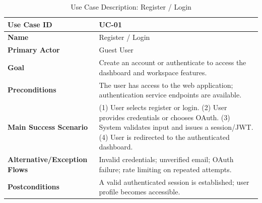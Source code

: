 \begin{table}[H]
    \centering
    \small
    \begin{tabularx}{\textwidth}{|l|X|}
        \hline
        \textbf{Use Case ID}                 & UC-01                                                                                                                                                                                           \\
        \hline
        \textbf{Name}                        & Register / Login                                                                                                                                                                                \\
        \hline
        \textbf{Primary Actor}               & Guest User                                                                                                                                                                                      \\
        \hline
        \textbf{Goal}                        & Create an account or authenticate to access the dashboard and workspace features.                                                                                                               \\
        \hline
        \textbf{Preconditions}               & The user has access to the web application; authentication service endpoints are available.                                                                                                     \\
        \hline
        \textbf{Main Success Scenario}       & (1) User selects register or login. (2) User provides credentials or chooses OAuth. (3) System validates input and issues a session/JWT. (4) User is redirected to the authenticated dashboard. \\
        \hline
        \textbf{Alternative/Exception Flows} & Invalid credentials; unverified email; OAuth failure; rate limiting on repeated attempts.                                                                                                       \\
        \hline
        \textbf{Postconditions}              & A valid authenticated session is established; user profile becomes accessible.                                                                                                                  \\
        \hline
    \end{tabularx}
    \caption{Use Case Description: Register / Login}
    \label{tab:uc-01}
\end{table}

